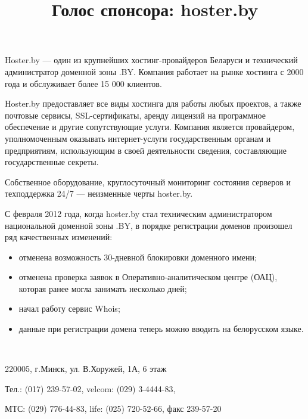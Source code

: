 \documentclass[10pt, a5paper]{article}
\begin{document}
\title{Голос спонсора: hoster.by}
\date{}
\maketitle%

Hoster.by --- один из крупнейших хостинг-провайдеров Беларуси и технический администратор доменной зоны .BY. Компания работает на рынке хостинга с 2000 года и обслуживает более 15 000 клиентов. 

Hoster.by предоставляет все виды хостинга для работы любых проектов, а также почтовые сервисы, SSL-сертификаты, аренду лицензий на программное обеспечение и другие сопутствующие услуги. Компания является провайдером, уполномоченным оказывать интернет-услуги государственным органам и предприятиям, \linebreak использующим в своей деятельности сведения, составляющие государственные секреты.

Собственное оборудование, круглосуточный мониторинг состояния серверов и техподдержка 24/7 --- неизменные черты hoster.by.

С февраля 2012 года, когда hoster.by стал техническим администратором национальной доменной зоны .BY, в порядке регистрации доменов произошел ряд качественных изменений:

\begin{itemize}
\item отменена возможность 30-дневной блокировки доменного имени;
\item отменена проверка заявок в Оперативно-аналитическом центре (ОАЦ), которая ранее могла занимать несколько дней;
\item начал работу сервис Whois;
\item данные при регистрации домена теперь можно вводить на белорусском языке.
\end{itemize}

~

\begin{flushright}
220005, г.Минск, ул. В.Хоружей, 1А, 6 этаж 

Тел.: (017) 239-57-02, velcom: (029) 3-4444-83, 

МТС: (029) 776-44-83, life: (025) 720-52-66, факс 239-57-20
\end{flushright}
\end{document}
